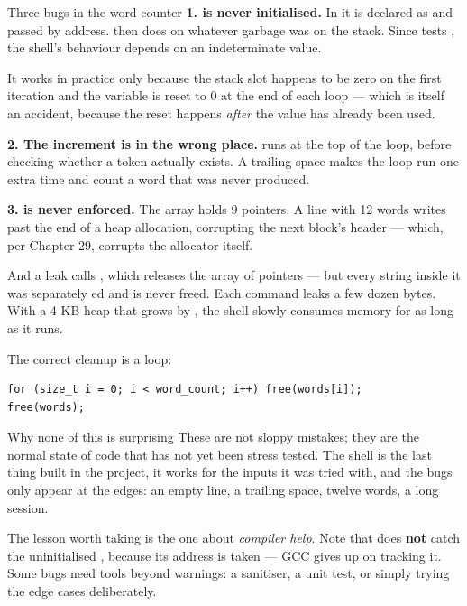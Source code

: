 \begin{danger}{Three bugs in the word counter}
\textbf{1.  is never initialised.} In  it is declared as
 and passed by address.  then does
 on whatever garbage was on the stack. Since  tests
, the shell's behaviour depends on an indeterminate value.

It works in practice only because the stack slot happens to be zero on the first iteration and the
variable is reset to 0 at the end of each loop --- which is itself an accident, because the reset
happens \emph{after} the value has already been used.

\textbf{2. The increment is in the wrong place.}  runs at the top of the loop,
before checking whether a token actually exists. A trailing space makes the loop run one extra time
and count a word that was never produced.

\textbf{3.  is never enforced.} The array holds 9 pointers. A line with 12 words
writes past the end of a heap allocation, corrupting the next block's header --- which, per Chapter
29, corrupts the allocator itself.
\end{danger}

\begin{warn}{And a leak}
 calls , which releases the array of pointers --- but every string
inside it was separately ed and is never freed. Each command leaks a few dozen bytes.
With a 4 KB heap that grows by , the shell slowly consumes memory for as long as it runs.

The correct cleanup is a loop:
\begin{lstlisting}[style=c]
for (size_t i = 0; i < word_count; i++) free(words[i]);
free(words);
\end{lstlisting}
\end{warn}

\begin{concept}{Why none of this is surprising}
These are not sloppy mistakes; they are the normal state of code that has not yet been stress
tested. The shell is the last thing built in the project, it works for the inputs it was tried with,
and the bugs only appear at the edges: an empty line, a trailing space, twelve words, a long
session.

The lesson worth taking is the one about \emph{compiler help}. Note that  does
\textbf{not} catch the uninitialised , because its address is taken --- GCC gives
up on tracking it. Some bugs need tools beyond warnings: a sanitiser, a unit test, or simply trying
the edge cases deliberately.
\end{concept}

